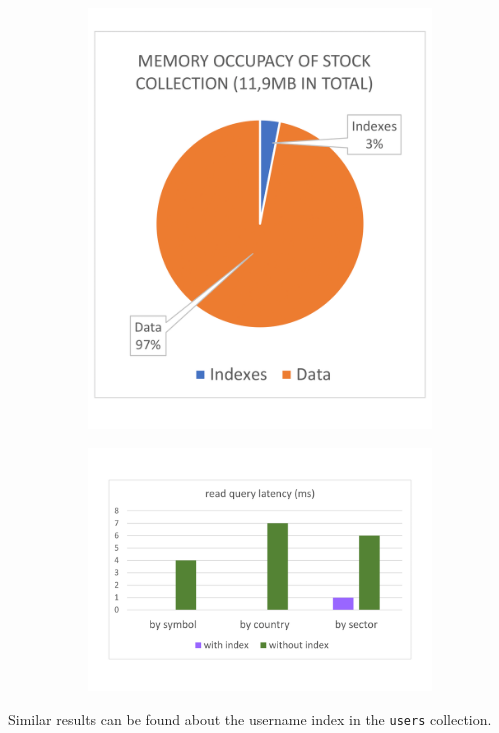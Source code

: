 \begin{figure}[H]
\hspace{-1.0cm}
\centering
\begin{subfigure}{.5\textwidth}
  \centering
  \includegraphics[scale=0.25]{img/memory_mongo.png}
\end{subfigure}%
\begin{subfigure}{.5\textwidth}
  \centering
  \includegraphics[scale=0.13]{img/latency_mongo.png}
\end{subfigure}
\end{figure}
\noindent Similar results can be found about the username index in the
\texttt{users} collection.
